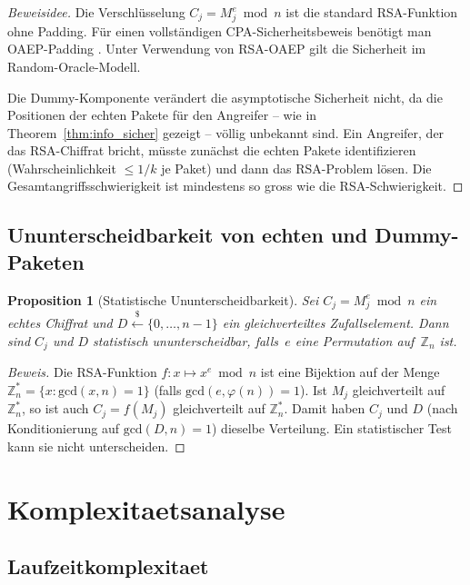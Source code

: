 ﻿\documentclass[12pt, a4paper]{article}
\theoremstyle{plain}
\newtheorem{proposition}[theorem]{Proposition}
\theoremstyle{definition}
\theoremstyle{remark}
\newenvironment{myproof}[1][Beweis]{%
  \begin{proof}[#1]
}{%
  \end{proof}
}
\newcommand{\Z}{\mathbb{Z}}
\newcommand{\GCD}{\mathrm{gcd}}
\begin{document}
\begin{myproof}[Beweisidee]
  Die Verschl\"usselung $C_j = M_j^e \bmod n$ ist die standard RSA-Funktion
  ohne Padding. F\"ur einen vollst\"andigen CPA-Sicherheitsbeweis
  ben\"otigt man OAEP-Padding \cite{bellare1994optimal}.
  Unter Verwendung von RSA-OAEP gilt die Sicherheit im Random-Oracle-Modell.

  Die Dummy-Komponente ver\"andert die asymptotische Sicherheit nicht,
  da die Positionen der echten Pakete f\"ur den Angreifer -- wie in
  Theorem~\ref{thm:info_sicher} gezeigt -- v\"ollig unbekannt sind.
  Ein Angreifer, der das RSA-Chiffrat bricht, m\"usste zun\"achst
  die echten Pakete identifizieren (Wahrscheinlichkeit $\leq 1/k$ je Paket)
  und dann das RSA-Problem l\"osen. Die Gesamtangriffsschwierigkeit ist
  mindestens so gross wie die RSA-Schwierigkeit. 
\end{myproof}

\subsection{Ununterscheidbarkeit von echten und Dummy-Paketen}

\begin{proposition}[Statistische Ununterscheidbarkeit]\label{prop:ununterscheidbar}
  Sei $C_j = M_j^e \bmod n$ ein echtes Chiffrat und
  $D \xleftarrow{\$} \{0,\ldots,n-1\}$ ein gleichverteiltes Zufallselement.
  Dann sind $C_j$ und $D$ statistisch ununterscheidbar, falls~$e$ eine
  Permutation auf~$\Z_n$ ist.
\end{proposition}

\begin{myproof}
  Die RSA-Funktion $f: x \mapsto x^e \bmod n$ ist eine Bijektion auf der
  Menge $\Z_n^* = \{x : \GCD(x,n)=1\}$ (falls $\GCD(e,\varphi(n))=1$).
  Ist $M_j$ gleichverteilt auf~$\Z_n^*$, so ist auch $C_j = f(M_j)$
  gleichverteilt auf $\Z_n^*$. Damit haben $C_j$ und $D$ (nach Konditionierung
  auf $\GCD(D,n)=1$) dieselbe Verteilung. Ein statistischer Test kann sie
  nicht unterscheiden. 
\end{myproof}

\section{Komplexitaetsanalyse}
\label{sec:komplexitaet}

\subsection{Laufzeitkomplexitaet}
\end{document}
